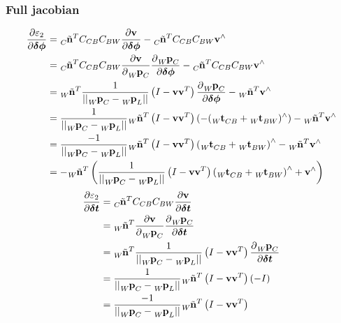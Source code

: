 \documentclass[10pt,a4paper]{article}
\numberwithin{equation}{section}
\renewcommand{\vec}[1]{\ensuremath{\mathbf{#1}}}
\newcommand{\vecs}[1]{\ensuremath{\boldsymbol{#1}}}
\newcommand{\norm}[1]{\ensuremath{\left|\left|#1\right|\right|}}
\begin{document}
\subsubsection{Full jacobian}
\begin{align}
\frac{\partial\varepsilon_2}{\partial\vecs{\delta\phi}} &= \tensor[_C]{\tilde{\vec{n}}}{^T} C_{CB} C_{BW}\frac{\partial \vec{v}}{\partial\vecs{\delta\phi}} - \tensor[_C]{\tilde{\vec{n}}}{^T} C_{CB} C_{BW}\vec{v}^\wedge\\
&= \tensor[_C]{\tilde{\vec{n}}}{^T} C_{CB} C_{BW}\frac{\partial \vec{v}}{\partial\tensor[_W]{\vec{p}}{_C}} 
\frac{\partial \tensor[_W]{\vec{p}}{_{C}}}{\partial \vecs{\delta\phi}}
 - \tensor[_C]{\tilde{\vec{n}}}{^T} C_{CB} C_{BW}\vec{v}^\wedge\\
&= \tensor[_W]{\tilde{\vec{n}}}{^T}
\frac{1}{\norm{\tensor[_W]{\vec{p}}{_C} - \tensor[_W]{\vec{p}}{_L}}}
\left(
I - \vec{v}\vec{v}^T
\right)
\frac{\partial \tensor[_W]{\vec{p}}{_{C}}}{\partial \vecs{\delta\phi}}
 - \tensor[_W]{\tilde{\vec{n}}}{^T} \vec{v}^\wedge\\
 &= \frac{1}{\norm{\tensor[_W]{\vec{p}}{_C} - \tensor[_W]{\vec{p}}{_L}}}\tensor[_W]{\tilde{\vec{n}}}{^T}
\left(
I - \vec{v}\vec{v}^T
\right)
\left(-(\tensor[_W]{\vec{t}}{_{CB}} + \tensor[_W]{\vec{t}}{_{BW}})^\wedge\right)
 - \tensor[_W]{\tilde{\vec{n}}}{^T} \vec{v}^\wedge\\
 &=\frac{-1}{\norm{\tensor[_W]{\vec{p}}{_C} - \tensor[_W]{\vec{p}}{_L}}}\tensor[_W]{\tilde{\vec{n}}}{^T}
\left(
I - \vec{v}\vec{v}^T
\right)
\left(\tensor[_W]{\vec{t}}{_{CB}} + \tensor[_W]{\vec{t}}{_{BW}}\right)^\wedge
 - \tensor[_W]{\tilde{\vec{n}}}{^T} \vec{v}^\wedge\\
&=-\tensor[_W]{\tilde{\vec{n}}}{^T}\left(\frac{1}{\norm{\tensor[_W]{\vec{p}}{_C} - \tensor[_W]{\vec{p}}{_L}}}
\left(
I - \vec{v}\vec{v}^T
\right)
\left(\tensor[_W]{\vec{t}}{_{CB}} + \tensor[_W]{\vec{t}}{_{BW}}\right)^\wedge + \vec{v}^\wedge\right)
\end{align}
\begin{align}
\frac{\partial\varepsilon_2}{\partial\vecs{\delta t}} &= 
\tensor[_C]{\tilde{\vec{n}}}{^T} C_{CB} C_{BW}\frac{\partial\vec{v}}{\partial \vecs{\delta t}}\\
&= 
\tensor[_W]{\tilde{\vec{n}}}{^T} 
\frac{\partial \vec{v}}{\partial\tensor[_W]{\vec{p}}{_C}}
\frac{\partial \tensor[_W]{\vec{p}}{_C}}{\partial \vecs{\delta t}}\\
&=
\tensor[_W]{\tilde{\vec{n}}}{^T} 
\frac{1}{\norm{\tensor[_W]{\vec{p}}{_C} - \tensor[_W]{\vec{p}}{_L}}}
\left(
I - \vec{v}\vec{v}^T
\right)
\frac{\partial \tensor[_W]{\vec{p}}{_C}}{\partial \vecs{\delta t}}\\
&=
\frac{1}{\norm{\tensor[_W]{\vec{p}}{_C} - \tensor[_W]{\vec{p}}{_L}}}
\tensor[_W]{\tilde{\vec{n}}}{^T}
\left(
I - \vec{v}\vec{v}^T
\right)
(-I)\\
&=\frac{-1}{\norm{\tensor[_W]{\vec{p}}{_C} - \tensor[_W]{\vec{p}}{_L}}}
\tensor[_W]{\tilde{\vec{n}}}{^T}
\left(
I - \vec{v}\vec{v}^T
\right)
\end{align}

\nocite{*}


\end{document}
